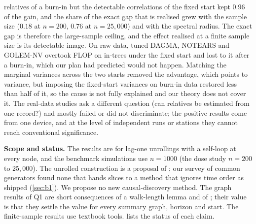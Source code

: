\documentclass[pdflatex,sn-apa]{sn-jnl}
\theoremstyle{thmstyleone}
\theoremstyle{thmstylethree}
\theoremstyle{thmstyletwo}
\begin{document}
relatives of a burn-in but the detectable correlations of the fixed start kept
$0.96$ of the gain, and the share of the exact gap that is realised grew with
the sample size ($0.18$ at $n=200$, $0.76$ at $n=25{,}000$) and with the
spectral radius. The exact gap is therefore the large-sample ceiling, and the
effect realised at a finite sample size is its detectable image. On raw data,
tuned DAGMA, NOTEARS and GOLEM-NV overtook FLOP on in-trees under the fixed
start and lost to it after a burn-in, which our plan had predicted would not
happen. Matching the marginal variances across the two starts removed the
advantage, which points to variance, but imposing the fixed-start variances on
burn-in data restored less than half of it, so the cause is not fully explained
and our theory does not cover it. The real-data studies ask a different
question (can relatives be estimated from one record?) and mostly failed or did
not discriminate; the positive results come from one device, and at the level
of independent runs or stations they cannot reach conventional significance.

\textbf{Scope and status.} The results are for lag-one unrollings with a
self-loop at every node, and the benchmark simulations use $n=1000$ (the dose study
$n=200$ to $25{,}000$). The unrolled
construction is a proposal of \citet{reisach2026topological}; our survey of
common generators found none that hands slices to a method that ignores time
order as shipped (\cref{sec:b1}). We propose no new causal-discovery method.
The graph results of Q1 are short consequences of a walk-length lemma and of
\citet[Lemma~1]{reisach2026topological}; their value is that they settle the
value for every summary graph, horizon and start. The finite-sample results use
textbook tools.  lists the status of each claim.
\end{document}
